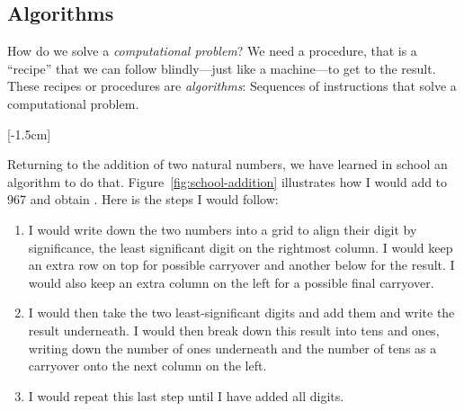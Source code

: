 \documentclass{aldast}
\begin{document}
\subsection{Algorithms}

How do we solve a \emph{computational problem}? We need a procedure,
that is a ``recipe'' that we can follow blindly---just like a
machine---to get to the result. These recipes or procedures are
\emph{algorithms}: Sequences of instructions that solve a
computational problem.

[-1.5cm]

Returning to the addition of two natural numbers, we have learned in
school an algorithm to do that. Figure~\ref{fig:school-addition}
illustrates how I would add  to 967 and obtain
. Here is the steps I would follow:
\begin{enumerate}
\item I would write down the two numbers into a grid to align their
  digit by significance, the least significant digit on the rightmost
  column. I would keep an extra row on top for possible carryover and
  another below for the result. I would also keep an extra column on
  the left for a possible final carryover.
\item I would then take the two least-significant digits and add them
  and write the result underneath. I would then break down this result
  into tens and ones, writing down the number of ones underneath and
  the number of tens as a carryover onto the next column on the left.
\item I would repeat this last step until I have added all digits.
\end{enumerate}
\end{document}
